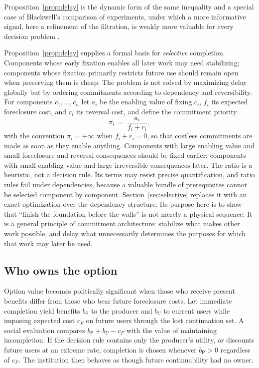 Proposition~\ref{prop:delay} is the dynamic form of the same inequality and a special case of Blackwell's comparison of experiments, under which a more informative signal, here a refinement of the filtration, is weakly more valuable for every decision problem \cite{blackwell1953}.

Proposition~\ref{prop:delay} supplies a formal basis for \emph{selective} completion. Components whose early fixation enables all later work may need stabilizing; components whose fixation primarily restricts future use should remain open when preserving them is cheap. The problem is not solved by maximizing delay globally but by ordering commitments according to dependency and reversibility. For components $c_1,\dots,c_n$ let $a_i$ be the enabling value of fixing $c_i$, $f_i$ its expected foreclosure cost, and $r_i$ its reversal cost, and define the commitment priority
\begin{equation}\label{eq:priority}
\pi_i\ =\ \frac{a_i}{f_i+r_i},
\end{equation}
with the convention $\pi_i=+\infty$ when $f_i+r_i=0$, so that costless commitments are made as soon as they enable anything. Components with large enabling value and small foreclosure and reversal consequences should be fixed earlier; components with small enabling value and large irreversible consequences later. The ratio is a heuristic, not a decision rule. Its terms may resist precise quantification, and ratio rules fail under dependencies, because a valuable bundle of prerequisites cannot be selected component by component. Section~\ref{sec:selective} replaces it with an exact optimization over the dependency structure. Its purpose here is to show that ``finish the foundation before the walls'' is not merely a physical sequence. It is a general principle of commitment architecture: stabilize what makes other work possible, and delay what unnecessarily determines the purposes for which that work may later be used.

\subsection{Who owns the option}

Option value becomes politically significant when those who receive present benefits differ from those who bear future foreclosure costs. Let immediate completion yield benefits $b_{\mathsf{P}}$ to the producer and $b_U$ to current users while imposing expected cost $c_F$ on future users through the lost continuation set. A social evaluation compares $b_{\mathsf{P}}+b_U-c_F$ with the value of maintaining incompletion. If the decision rule contains only the producer's utility, or discounts future users at an extreme rate, completion is chosen whenever $b_{\mathsf{P}}>0$ regardless of $c_F$. The institution then behaves as though future continuability had no owner.


